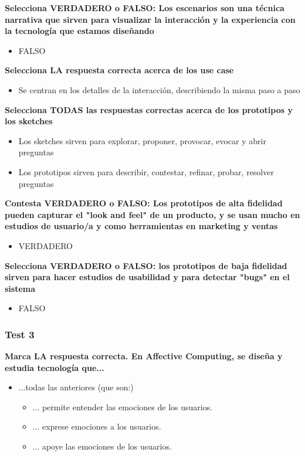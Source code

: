 \documentclass[12pt, twoside, openright]{report} %
\begin{document}
\textbf{Selecciona VERDADERO o FALSO: Los escenarios son una técnica narrativa que sirven para visualizar la interacción y la experiencia con la tecnología que estamos diseñando}
\begin{itemize}
	\item FALSO
\end{itemize}

\textbf{Selecciona LA respuesta correcta acerca de los use case}
\begin{itemize}
	\item Se centran en los detalles de la interacción, describiendo la misma paso a paso
\end{itemize}

\textbf{Selecciona TODAS las respuestas correctas acerca de los prototipos y los sketches}
\begin{itemize}
	\item Los sketches sirven para explorar, proponer, provocar, evocar y abrir preguntas
	\item Los prototipos sirven para describir, contestar, refinar, probar, resolver preguntas
\end{itemize}

\textbf{Contesta VERDADERO o FALSO: Los prototipos de alta fidelidad pueden capturar el "look and feel" de un producto, y se usan mucho en estudios de usuario/a y como herramientas en marketing y ventas}
\begin{itemize}
	\item VERDADERO
\end{itemize}

\textbf{Selecciona VERDADERO o FALSO: los prototipos de baja fidelidad sirven para hacer estudios de usabilidad y para detectar "bugs"  en el sistema}
\begin{itemize}
	\item FALSO
\end{itemize}
\pagebreak
\subsubsection{Test 3}

\textbf{Marca LA respuesta correcta. En Affective Computing, se diseña y estudia tecnología que...}
\begin{itemize}
	\item ...todas las anteriores (que son:)
	      \begin{itemize}
		      \item ... permite entender las emociones de los usuarios.
		      \item ... exprese emociones a los usuarios.
		      \item ... apoye las emociones de los usuarios.
	      \end{itemize}
\end{itemize}
\end{document}
